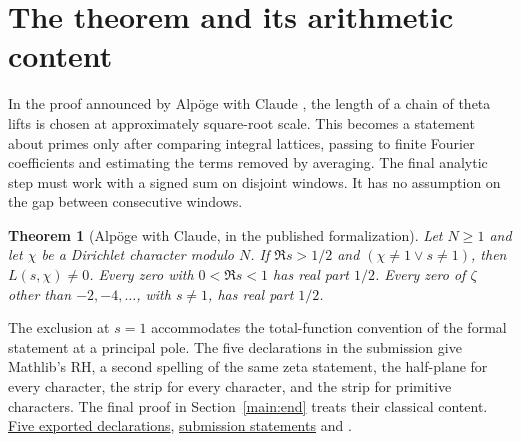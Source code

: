 \documentclass[11pt,a4paper]{article}
\newcommand{\src}[3]{\href{https://github.com/leanprover-community/riemann-hypothesis/blob/40e56bab026552e089d7afcfeff08d2defb9c005/\detokenize{#1}\#L#2}{\textcolor{sourceblue}{#3}}}
\newtheorem{theorem}{Theorem}[section]
\theoremstyle{definition}
\theoremstyle{remark}
\numberwithin{equation}{section}
\begin{document}
\section{The theorem and its arithmetic content}\label{intro:main}
In the proof announced by Alpöge with Claude \cite{announce}, the length of a chain of theta lifts is chosen at approximately square-root scale. This becomes a statement about primes only after comparing integral lattices, passing to finite Fourier coefficients and estimating the terms removed by averaging. The final analytic step must work with a signed sum on disjoint windows. It has no assumption on the gap between consecutive windows.

\begin{theorem}[Alpöge with Claude, in the published formalization]\label{main:thm}
Let \(N\ge1\) and let \(\chi\) be a Dirichlet character modulo \(N\). If \(\Re s>1/2\) and \((\chi\ne1\lor s\ne1)\), then \(L(s,\chi)\ne0\). Every zero with \(0<\Re s<1\) has real part \(1/2\). Every zero of \(\zeta\) other than \(-2,-4,\ldots\), with \(s\ne1\), has real part \(1/2\).
\end{theorem}
The exclusion at \(s=1\) accommodates the total-function convention of the formal statement at a principal pole. The five declarations in the submission give Mathlib's RH, a second spelling of the same zeta statement, the half-plane for every character, the strip for every character, and the strip for primitive characters. The final proof in Section~\ref{main:end} treats their classical content. \src{src/Main.lean}{4}{Five exported declarations}, \src{src/Statements.lean}{3}{submission statements} and \cite{mathlib}.
\end{document}
